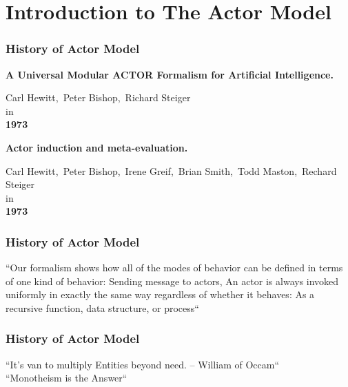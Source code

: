 \documentclass[notheorems, aspectratio=54]{beamer}
\begin{document}
\section{Introduction to The Actor Model}
\begin{frame}
  \frametitle{History of Actor Model}
  \begin{center}
    \bfseries{A Universal Modular ACTOR Formalism for Artificial Intelligence.}
  \end{center}
  \begin{center}
    Carl Hewitt,\  Peter Bishop,\ Richard Steiger\\
    in\\
    \bfseries{1973}
  \end{center}
  \begin {center}
  \end {center}

    \begin{center}
    \bfseries{Actor induction and meta-evaluation.}
  \end{center}
  \begin{center}
    Carl Hewitt,\  Peter Bishop,\ Irene Greif,\ Brian Smith,\ Todd Maston,\ Rechard Steiger\\
    in\\
    \bfseries{1973}
  \end{center}
  \begin {center}
  \end {center}
\end{frame}
\begin{frame}
  \frametitle{History of Actor Model}
  \begin{center}
    ``Our formalism shows how all of the modes of behavior can be defined in terms of one kind of behavior: Sending message to actors, An actor is always invoked uniformly in exactly the same way regardless of whether it behaves: As a recursive function, data structure, or process``\cite{actor}\cite{meta}
  \end{center}
\end{frame}

\begin{frame}
  \frametitle{History of Actor Model}
    \begin{center}
    ``It's van to multiply Entities beyond need. -- William of Occam``\\
    ``Monotheism is the Answer``\cite{actor}
  \end{center}
\end{frame}
\end{document}
